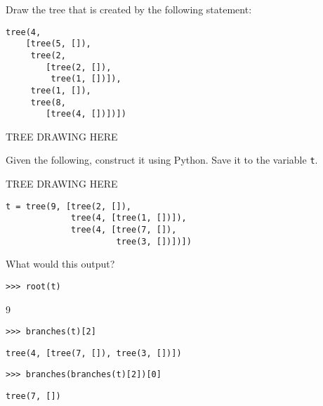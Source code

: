 \documentclass{exam}
\begin{document}
\begin{questions}


\begin{blocksection}
\question Draw the tree that is created by the following statement:

\begin{lstlisting}
tree(4,
    [tree(5, []),
     tree(2,
        [tree(2, []),
         tree(1, [])]),
     tree(1, []),
     tree(8,
        [tree(4, [])])])
\end{lstlisting}
\begin{solution}[4in]
    TREE DRAWING HERE
\end{solution}

\end{blocksection}

\begin{blocksection}
\question Given the following, construct it using Python. Save it to the
variable \texttt{t}.

TREE DRAWING HERE

\begin{solution}[4in]
\begin{lstlisting}
t = tree(9, [tree(2, []),
             tree(4, [tree(1, [])]),
             tree(4, [tree(7, []),
                      tree(3, [])])])
\end{lstlisting}
\end{solution}

\end{blocksection}

\begin{blocksection}
\question What would this output?

\begin{lstlisting}
>>> root(t)
\end{lstlisting}
\begin{solution}[.25in]
9
\end{solution}

\begin{lstlisting}
>>> branches(t)[2]
\end{lstlisting}
\begin{solution}[.25in]
\begin{lstlisting}
tree(4, [tree(7, []), tree(3, [])])
\end{lstlisting}
\end{solution}

\begin{lstlisting}
>>> branches(branches(t)[2])[0]
\end{lstlisting}
\begin{solution}[.25in]
\begin{lstlisting}
tree(7, [])
\end{lstlisting}
\end{solution}
\end{blocksection}


\end{questions}
\end{document}
